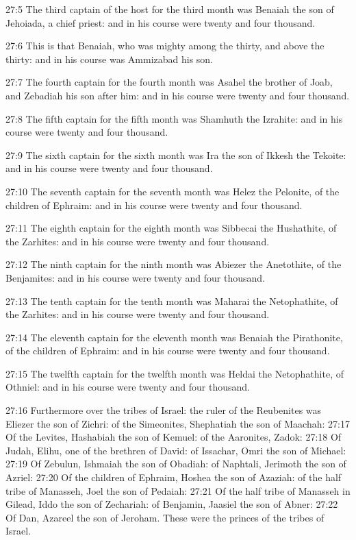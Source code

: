 27:5 The third captain of the host for the third month was Benaiah the
son of Jehoiada, a chief priest: and in his course were twenty and
four thousand.

27:6 This is that Benaiah, who was mighty among the thirty, and above
the thirty: and in his course was Ammizabad his son.

27:7 The fourth captain for the fourth month was Asahel the brother of
Joab, and Zebadiah his son after him: and in his course were twenty
and four thousand.

27:8 The fifth captain for the fifth month was Shamhuth the Izrahite:
and in his course were twenty and four thousand.

27:9 The sixth captain for the sixth month was Ira the son of Ikkesh
the Tekoite: and in his course were twenty and four thousand.

27:10 The seventh captain for the seventh month was Helez the
Pelonite, of the children of Ephraim: and in his course were twenty
and four thousand.

27:11 The eighth captain for the eighth month was Sibbecai the
Hushathite, of the Zarhites: and in his course were twenty and four
thousand.

27:12 The ninth captain for the ninth month was Abiezer the
Anetothite, of the Benjamites: and in his course were twenty and four
thousand.

27:13 The tenth captain for the tenth month was Maharai the
Netophathite, of the Zarhites: and in his course were twenty and four
thousand.

27:14 The eleventh captain for the eleventh month was Benaiah the
Pirathonite, of the children of Ephraim: and in his course were twenty
and four thousand.

27:15 The twelfth captain for the twelfth month was Heldai the
Netophathite, of Othniel: and in his course were twenty and four
thousand.

27:16 Furthermore over the tribes of Israel: the ruler of the
Reubenites was Eliezer the son of Zichri: of the Simeonites,
Shephatiah the son of Maachah: 27:17 Of the Levites, Hashabiah the son
of Kemuel: of the Aaronites, Zadok: 27:18 Of Judah, Elihu, one of the
brethren of David: of Issachar, Omri the son of Michael: 27:19 Of
Zebulun, Ishmaiah the son of Obadiah: of Naphtali, Jerimoth the son of
Azriel: 27:20 Of the children of Ephraim, Hoshea the son of Azaziah:
of the half tribe of Manasseh, Joel the son of Pedaiah: 27:21 Of the
half tribe of Manasseh in Gilead, Iddo the son of Zechariah: of
Benjamin, Jaasiel the son of Abner: 27:22 Of Dan, Azareel the son of
Jeroham. These were the princes of the tribes of Israel.

